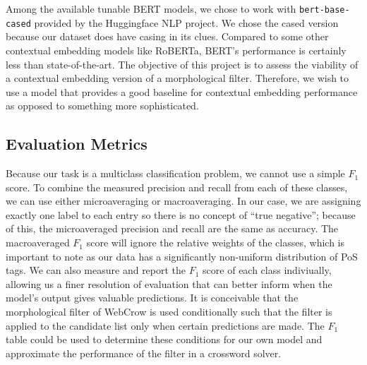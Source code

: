 \documentclass[11pt]{article}
\begin{document}
Among the available tunable BERT models, we chose to work with \texttt{bert-base-cased} provided by the Huggingface NLP project. We chose the cased version because our dataset does have casing in its clues. Compared to some other contextual embedding models like RoBERTa, BERT's performance is certainly less than state-of-the-art. The objective of this project is to assess the viability of a contextual embedding version of a morphological filter. Therefore, we wish to use a model that provides a good baseline for contextual embedding performance as opposed to something more sophisticated.

\subsection{Evaluation Metrics}
Because our task is a multiclass classification problem, we cannot use a simple $F_1$ score. To combine the measured precision and recall from each of these classes, we can use either microaveraging or macroaveraging. In our case, we are assigning exactly one label to each entry so there is no concept of ``true negative''; because of this, the microaveraged precision and recall are the same as accuracy. The macroaveraged $F_1$ score will ignore the relative weights of the classes, which is important to note as our data has a significantly non-uniform distribution of PoS tags. We can also measure and report the $F_1$ score of each class indiviually, allowing us a finer resolution of evaluation that can better inform when the model's output gives valuable predictions. It is conceivable that the morphological filter of WebCrow is used conditionally such that the filter is applied to the candidate list only when certain predictions are made. The $F_1$ table could be used to determine these conditions for our own model and approximate the performance of the filter in a crossword solver.
\end{document}
